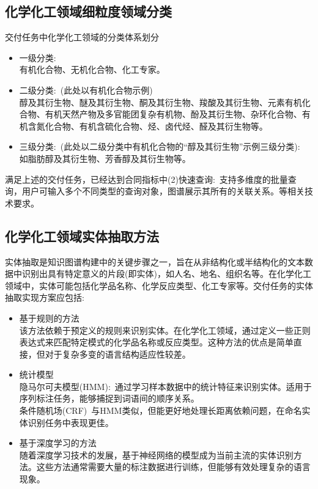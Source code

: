 \subsection{\hwfs 化学化工领域细粒度领域分类}
交付任务中化学化工领域的分类体系划分
\begin{itemize}
	\item {\hwfs 一级分类:}\\
		有机化合物、无机化合物、化工专家。
	\item {\hwfs 二级分类:}~(此处以有机化合物示例)\\
		醇及其衍生物、醚及其衍生物、酮及其衍生物、羧酸及其衍生物、元素有机化合物、有机天然产物及多官能团复杂有机物、酚及其衍生物、杂环化合物、有机含氮化合物、有机含硫化合物、烃、卤代烃、醛及其衍生物等。
	\item {\hwfs 三级分类:}~(此处以二级分类中有机化合物的``醇及其衍生物''示例三级分类):~\\
		如脂肪醇及其衍生物、芳香醇及其衍生物等。 
\end{itemize}
满足上述的交付任务，已经达到合同指标中{\heiti (2)快速查询:~支持多维度的批量查询，用户可输入多个不同类型的查询对象，图谱展示其所有的关联关系。}等相关技术要求。

  \subsection{\hwfs 化学化工领域实体抽取方法}
实体抽取是知识图谱构建中的关键步骤之一，旨在从非结构化或半结构化的文本数据中识别出具有特定意义的片段(即实体)，如人名、地名、组织名等。在化学化工领域中，实体可能包括化学品名称、化学反应类型、化工专家等。交付任务的实体抽取实现方案应包括:
\begin{itemize}
	\item 基于规则的方法\\
该方法依赖于预定义的规则来识别实体。在化学化工领域，通过定义一些正则表达式来匹配特定模式的化学品名称或反应类型。这种方法的优点是简单直接，但对于复杂多变的语言结构适应性较差。 
\item 统计模型\\ 
	隐马尔可夫模型\textrm{(HMM)}:~通过学习样本数据中的统计特征来识别实体。适用于序列标注任务，能够捕捉到词语间的顺序关系。\\ 
	条件随机场\textrm{(CRF)}~与\textrm{HMM}类似，但能更好地处理长距离依赖问题，在命名实体识别任务中表现更佳。

\item 基于深度学习的方法\\ 
随着深度学习技术的发展，基于神经网络的模型成为当前主流的实体识别方法。这些方法通常需要大量的标注数据进行训练，但能够有效处理复杂的语言现象。
\end{itemize}

